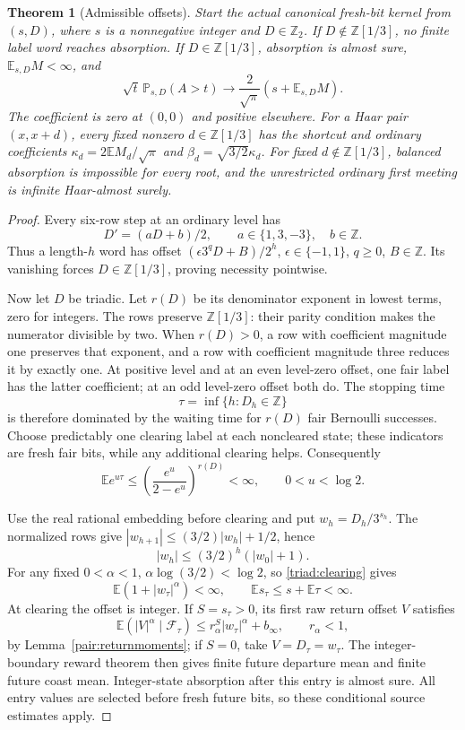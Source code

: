 \documentclass[11pt]{amsart}
\newtheorem{theorem}{Theorem}[section]
\theoremstyle{definition}
\theoremstyle{remark}
\newcommand{\Z}{\mathbb Z}
\newcommand{\E}{\mathbb E}
\newcommand{\PP}{\mathbb P}
\newcommand{\Ztwo}{\mathbb Z_2}
\begin{document}
\begin{theorem}[Admissible offsets]\label{triad:domain}
Start the actual canonical fresh-bit kernel from $(s,D)$, where $s$ is
a nonnegative integer and $D\in\Ztwo$. If $D\notin\Z[1/3]$, no
finite label word reaches absorption. If $D\in\Z[1/3]$, absorption
is almost sure, $\E_{s,D}M<\infty$, and
\[
 \sqrt t\,\PP_{s,D}(A>t)
       \longrightarrow\frac2{\sqrt\pi}(s+\E_{s,D}M).
\]
The coefficient is zero at $(0,0)$ and positive elsewhere.
For a Haar pair $(x,x+d)$, every fixed nonzero $d\in\Z[1/3]$ has
the shortcut and ordinary coefficients $\kappa_d=2\E M_d/\sqrt\pi$
and $\beta_d=\sqrt{3/2}\kappa_d$. For fixed $d\notin\Z[1/3]$,
balanced absorption is impossible for every root, and the unrestricted
ordinary first meeting is infinite Haar-almost surely.
\end{theorem}
\begin{proof}
Every six-row step at an ordinary level has
\[
 D'=(aD+b)/2,\qquad a\in\{1,3,-3\},\quad b\in\Z.
\]
Thus a length-$h$ word has offset
$(\epsilon3^qD+B)/2^h$, $\epsilon\in\{-1,1\}$, $q\ge0$, $B\in\Z$.
Its vanishing forces $D\in\Z[1/3]$, proving necessity pointwise.

Now let $D$ be triadic. Let $r(D)$ be its denominator exponent in lowest
terms, zero for integers. The rows preserve $\Z[1/3]$: their parity
condition makes the numerator divisible by two. When $r(D)>0$, a row
with coefficient magnitude one preserves that exponent, and a row with
coefficient magnitude three reduces it by exactly one. At positive
level and at an even level-zero offset, one fair label has the latter
coefficient; at an odd level-zero offset both do. The stopping time
\[
 \tau=\inf\{h:D_h\in\Z\}
\]
is therefore dominated by the waiting time for $r(D)$ fair Bernoulli
successes. Choose predictably one clearing label at each noncleared state;
these indicators are fresh fair bits, while any additional clearing helps.
Consequently
\begin{equation}\label{triad:clearing}
 \E e^{u\tau}\le\left(\frac{e^u}{2-e^u}\right)^{r(D)}<\infty,
 \qquad 0<u<\log2.
\end{equation}

Use the real rational embedding before clearing and put
$w_h=D_h/3^{s_h}$. The normalized rows give
$|w_{h+1}|\le(3/2)|w_h|+1/2$, hence
\[
 |w_h|\le(3/2)^h(|w_0|+1).
\]
For any fixed $0<\alpha<1$, $\alpha\log(3/2)<\log2$, so
\eqref{triad:clearing} gives
\[
 \E(1+|w_\tau|^\alpha)<\infty,\qquad
 \E s_\tau\le s+\E\tau<\infty.
\]
At clearing the offset is integer. If $S=s_\tau>0$, its first raw
return offset $V$ satisfies
\[
 \E(|V|^\alpha\mid\mathcal F_\tau)
       \le r_\alpha^S|w_\tau|^\alpha+b_\infty,
 \qquad r_\alpha<1,
\]
by Lemma~\ref{pair:returnmoments}; if $S=0$, take $V=D_\tau=w_\tau$.
The integer-boundary reward theorem then gives finite future departure
mean and finite future coast mean. Integer-state absorption after this
entry is almost sure. All entry values are selected before fresh future
bits, so these conditional source estimates apply.


\end{proof}
\end{document}
